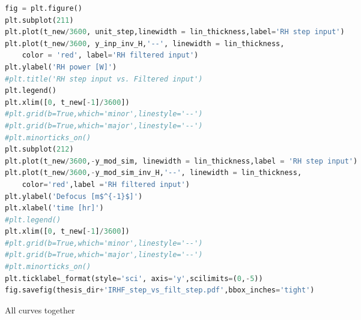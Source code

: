 \begin{spacing}{1.2} \begin{lstlisting}[frame=single,language=Python]
fig = plt.figure()
plt.subplot(211)
plt.plot(t_new/3600, unit_step,linewidth = lin_thickness,label='RH step input')
plt.plot(t_new/3600, y_inp_inv_H,'--', linewidth = lin_thickness,
    color = 'red', label='RH filtered input')
plt.ylabel('RH power [W]')
#plt.title('RH step input vs. Filtered input')
plt.legend()
plt.xlim([0, t_new[-1]/3600])
#plt.grid(b=True,which='minor',linestyle='--')
#plt.grid(b=True,which='major',linestyle='--')
#plt.minorticks_on()
plt.subplot(212)
plt.plot(t_new/3600,-y_mod_sim, linewidth = lin_thickness,label = 'RH step input')
plt.plot(t_new/3600,-y_mod_sim_inv_H,'--', linewidth = lin_thickness,
    color='red',label ='RH filtered input')
plt.ylabel('Defocus [m$^{-1}$]')
plt.xlabel('time [hr]')
#plt.legend()
plt.xlim([0, t_new[-1]/3600])
#plt.grid(b=True,which='minor',linestyle='--')
#plt.grid(b=True,which='major',linestyle='--')
#plt.minorticks_on()
plt.ticklabel_format(style='sci', axis='y',scilimits=(0,-5))
fig.savefig(thesis_dir+'IRHF_step_vs_filt_step.pdf',bbox_inches='tight')
\end{lstlisting} \end{spacing}



\noindent All curves together

